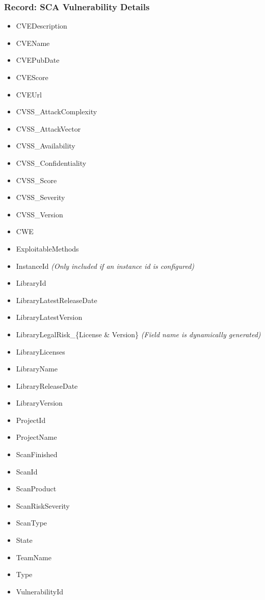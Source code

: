 \subsubsection{Record: SCA Vulnerability Details}

\begin{itemize}
    \item CVEDescription
    \item CVEName
    \item CVEPubDate
    \item CVEScore
    \item CVEUrl
    \item CVSS\_AttackComplexity
    \item CVSS\_AttackVector
    \item CVSS\_Availability
    \item CVSS\_Confidentiality
    \item CVSS\_Score
    \item CVSS\_Severity
    \item CVSS\_Version
    \item CWE
    \item ExploitableMethods
    \item InstanceId \textit{(Only included if an instance id is configured)}
    \item LibraryId
    \item LibraryLatestReleaseDate
    \item LibraryLatestVersion
    \item LibraryLegalRisk\_\{License \& Version\} \textit{(Field name is dynamically generated)}
    \item LibraryLicenses
    \item LibraryName
    \item LibraryReleaseDate
    \item LibraryVersion
    \item ProjectId
    \item ProjectName
    \item ScanFinished
    \item ScanId
    \item ScanProduct
    \item ScanRiskSeverity
    \item ScanType
    \item State
    \item TeamName
    \item Type
    \item VulnerabilityId
\end{itemize}


